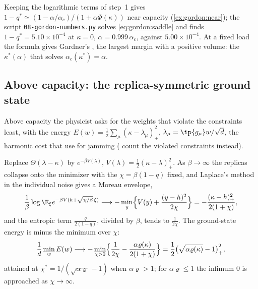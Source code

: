 \begin{refsection}
Keeping the logarithmic terms of step~1 gives $1-q^*\simeq(1-\alpha/\alpha_c)/(1+\alpha\Phi(\kappa))$ near capacity (\cref{ex:gordon:near}); the script \texttt{08-gordon-\allowbreak numbers.py} solves \eqref{eq:gordon:saddle} and finds $1-q^*=5.10\times10^{-4}$ at $\kappa=0$, $\alpha=0.999\,\alpha_c$, against $5.00\times10^{-4}$. At a fixed load the formula gives Gardner's , the largest margin with a positive volume: the $\kappa^*(\alpha)$ that solves $\alpha_c(\kappa^*)=\alpha$.

\subsection{Above capacity: the replica-symmetric ground state}\label{sec:gordon:ground}

Above capacity the physicist asks for the weights that violate the constraints least, with the energy $E(w)=\frac12\sum_\mu(\kappa-\lambda_\mu)_+^2$, $\lambda_\mu=\ip{g_\mu}w/\sqrt d$, the harmonic cost that \textcite{FranzEtAl2017} use for jamming (\textcite{GardnerDerrida1988} count the violated constraints instead).

\begin{heuristic}
Replace $\Theta(\lambda-\kappa)$ by $e^{-\beta V(\lambda)}$, $V(\lambda)=\frac12(\kappa-\lambda)_+^2$. As $\beta\to\infty$ the replicas collapse onto the minimizer with the  $\chi=\beta(1-q)$ fixed, and Laplace's method in the individual noise gives a Moreau envelope,
\[
\frac1\beta\log\E_\xi e^{-\beta V(h+\sqrt{\chi/\beta}\,\xi)}\longrightarrow-\min_y\Bigl\{V(y)+\frac{(y-h)^2}{2\chi}\Bigr\}=-\frac{(\kappa-h)_+^2}{2(1+\chi)},
\]
and the entropic term $\frac q{2(1-q)}$, divided by $\beta$, tends to $\frac1{2\chi}$. The ground-state energy is minus the minimum over $\chi$:
\begin{equation}\label{eq:gordon:ground}
\frac1d\min_wE(w)\longrightarrow-\min_{\chi>0}\Bigl\{\frac1{2\chi}-\frac{\alpha\varrho(\kappa)}{2(1+\chi)}\Bigr\}=\frac12\bigl(\sqrt{\alpha\varrho(\kappa)}-1\bigr)_+^2,
\end{equation}
attained at $\chi^*=1/(\sqrt{\alpha\varrho}-1)$ when $\alpha\varrho>1$; for $\alpha\varrho\le1$ the infimum $0$ is approached as $\chi\to\infty$.
\end{heuristic}


\end{refsection}
